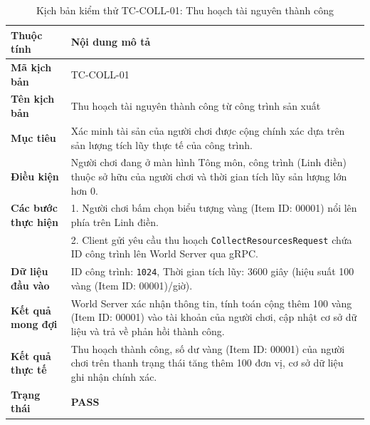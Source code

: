 \documentclass[../Project.tex]{subfiles}
\begin{document}
\begin{table}[H]
\centering
\begin{tabular}{|l|p{10.5cm}|}
\hline
\textbf{Thuộc tính} & \textbf{Nội dung mô tả} \\ \hline
\textbf{Mã kịch bản} & TC-COLL-01 \\ \hline
\textbf{Tên kịch bản} & Thu hoạch tài nguyên thành công từ công trình sản xuất \\ \hline
\textbf{Mục tiêu} & Xác minh tài sản của người chơi được cộng chính xác dựa trên sản lượng tích lũy thực tế của công trình. \\ \hline
\textbf{Điều kiện} & Người chơi đang ở màn hình Tông môn, công trình (Linh điền) thuộc sở hữu của người chơi và thời gian tích lũy sản lượng lớn hơn 0. \\ \hline
\textbf{Các bước thực hiện} & 
1. Người chơi bấm chọn biểu tượng vàng (Item ID: 00001) nổi lên phía trên Linh điền. \\
& 2. Client gửi yêu cầu thu hoạch \texttt{CollectResourcesRequest} chứa ID công trình lên World Server qua gRPC. \\ \hline
\textbf{Dữ liệu đầu vào} & ID công trình: \texttt{1024}, Thời gian tích lũy: 3600 giây (hiệu suất 100 vàng (Item ID: 00001)/giờ). \\ \hline
\textbf{Kết quả mong đợi} & World Server xác nhận thông tin, tính toán cộng thêm 100 vàng (Item ID: 00001) vào tài khoản của người chơi, cập nhật cơ sở dữ liệu và trả về phản hồi thành công. \\ \hline
\textbf{Kết quả thực tế} & Thu hoạch thành công, số dư vàng (Item ID: 00001) của người chơi trên thanh trạng thái tăng thêm 100 đơn vị, cơ sở dữ liệu ghi nhận chính xác. \\ \hline
\textbf{Trạng thái} & \textbf{PASS} \\ \hline
\end{tabular}
\caption{Kịch bản kiểm thử TC-COLL-01: Thu hoạch tài nguyên thành công}
\label{tab:tc_collect_01}
\end{table}
\end{document}
